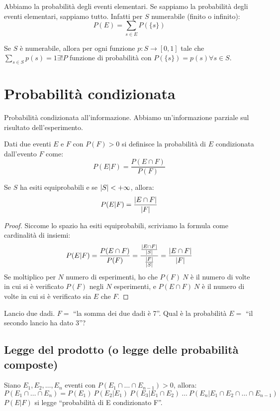 Abbiamo la probabilit\`a degli eventi elementari. Se sappiamo la probabilit\`a degli eventi elementari, sappiamo tutto. Infatti per $S$ numerabile (finito o infinito):
\[
P(E) = \sum_{s \in E} P(\{s\})
\]
\begin{prop}
Se $S$ \`e numerabile, allora per ogni funzione $p : S \to [0,1]$ tale che $\sum_{s \in S} p(s) = 1 \exists ! P$ funzione di probabilit\`a con $P(\{s\}) = p(s) \forall  s \in S$.
\end{prop}

\section{Probabilit\`a condizionata}

Probabilit\`a condizionata all'informazione. Abbiamo un'informazione parziale sul risultato dell'esperimento.

\begin{defn}
Dati due eventi $E$ e $F$ con $P(F) > 0$ si definisce la probabilit\`a di $E$ condizionata dall'evento $F$ come:
\[
P(E|F) = \frac{P(E \cap F)}{P(F)} 
\]
\end{defn}

\begin{oss}
Se $S$ ha esiti equiprobabili e se $\left\lvert{S}\right\rvert < + \infty$, allora:
\[
P(E|F) = \frac{\left\lvert{E \cap F}\right\rvert}{\left\lvert{F}\right\rvert}
\]
\end{oss}

\begin{proof}
Siccome lo spazio ha esiti equiprobabili, scriviamo la formula come cardinalit\`a di insiemi:
\[
P(E|F) = \frac{P(E \cap F)}{P(F)} = \frac{\frac{\left\lvert{E \cap F}\right\rvert}{\left\lvert{S}\right\rvert}}{\frac{\left\lvert{F}\right\rvert}{\left\lvert{S}\right\rvert}} = \frac{\left\lvert{E \cap F}\right\rvert}{\left\lvert{F}\right\rvert}
\]
Se moltiplico per $N$ numero di esperimenti, ho che $P(F)\ N$ \`e il numero di volte in cui si \`e verificato $P(F)$ negli $N$ esperimenti, e $P(E \cap F) \ N$ \`e il numero di volte in cui si \`e verificato sia $E$ che $F$.
\end{proof}

Lancio due dadi. $F =$ ``la somma dei due dadi \`e 7''. Qual \`e la probabilit\`a $E =$ ``il secondo lancio ha dato 3''?


\subsection{Legge del prodotto (o legge delle probabilit\`a composte)}
\begin{theorem}
Siano $E_1, E_2, \ldots, E_n$ eventi con $P(E_1 \cap \ldots \cap E_{n-1}) > 0$, allora:
\[
P(E_1 \cap \ldots \cap E_{n}) = P(E_1) \ P(E_2 | E_1) \ P(E_3 | E_1 \cap E_2) \ \ldots \ P(E_n | E_1 \cap E_2 \cap \ldots \cap E_{n-1})
\]
$P(E|F)$ si legge ``probabilit\`a di E condizionato F''.
\end{theorem}

